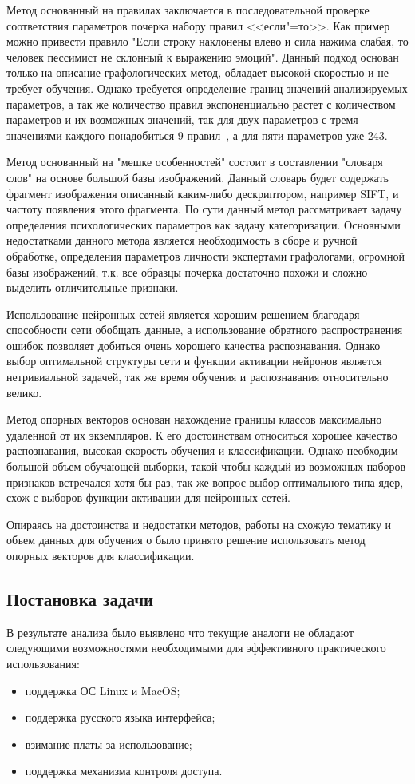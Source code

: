 Метод основанный на правилах заключается в последовательной проверке соответствия параметров почерка набору правил <<если"=то>>. Как пример можно привести правило "Если строку наклонены влево и сила нажима слабая, то человек пессимист не склонный к выражению эмоций". Данный подход основан только на описание графологических метод, обладает высокой скоростью и не требует обучения. Однако требуется определение границ значений анализируемых параметров, а так же количество правил экспоненциально растет с количеством параметров и их возможных значений, так для двух параметров с тремя значениями каждого понадобиться 9 правил~\cite{champa_ananda_kumar_rule_base}, а для пяти параметров уже 243.

Метод основанный на "мешке особенностей" состоит в составлении "словаря слов" на основе большой базы изображений. Данный словарь будет содержать фрагмент изображения описанный каким-либо дескриптором, например SIFT, и частоту появления этого фрагмента. По сути данный метод рассматривает задачу определения психологических параметров как задачу категоризации. Основными недостатками данного метода является необходимость в сборе и ручной обработке, определения параметров личности экспертами графологами, огромной базы изображений, т.к. все образцы почерка достаточно похожи и сложно выделить отличительные признаки.

Использование нейронных сетей является хорошим решением благодаря способности сети обобщать данные, а использование обратного распространения ошибок позволяет добиться очень хорошего качества распознавания. Однако выбор оптимальной структуры сети и функции активации нейронов является нетривиальной задачей, так же время обучения и распознавания относительно велико.

Метод опорных векторов основан нахождение границы классов максимально удаленной от их экземпляров. К его достоинствам относиться хорошее качество распознавания, высокая скорость обучения и классификации. Однако необходим большой объем обучающей выборки, такой чтобы каждый из возможных наборов признаков встречался хотя бы раз, так же вопрос выбор оптимального типа ядер, схож с выборов функции активации для нейронных сетей.

Опираясь на достоинства и недостатки методов, работы на схожую тематику и объем данных для обучения о было принято решение использовать метод опорных векторов для классификации.  

\subsection{Постановка задачи}
\label{sec:domain:requirements}
В результате анализа было выявлено что текущие аналоги не обладают следующими возможностями необходимыми для эффективного практического использования:
\begin{itemize}
  \item поддержка ОС Linux и MacOS;
  \item поддержка русского языка интерфейса;
  \item взимание платы за использование;
  \item поддержка механизма контроля доступа.
\end{itemize}

